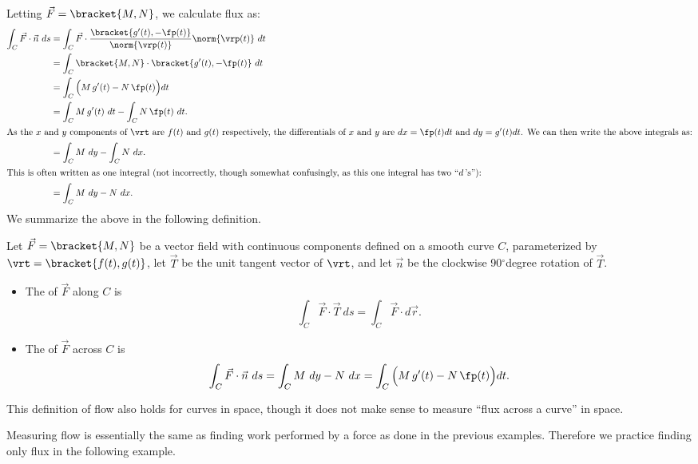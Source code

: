 Letting $\vec F =\bracket{M,N}$, we calculate flux as:
\begin{align*}
\int_C \vec F\cdot \vec n\ ds &= \int_C \vec F\cdot \frac{\bracket{g'(t),-\fp(t)}}{\norm{\vrp(t)}} \norm{\vrp(t)}\ dt \\
				&= \int_C\bracket{M,N}\cdot\bracket{g'(t),-\fp(t)}\ dt \\
				&= \int_C \Big(M\,g'(t) - N\,\fp(t)\Big)dt\\
				&= \int_C M\,g'(t)\ dt - \int_C N\,\fp(t)\ dt.\\
				\intertext{As the $x$ and $y$ components of $\vrt$ are $f(t)$ and $g(t)$ respectively, the differentials of $x$ and $y$ are $dx = \fp(t)dt$ and $dy=g'(t)dt$. We can then write the above integrals as:}
				&= \int_C M\ dy - \int_C N\ dx.\\
				\intertext{This is often written as one integral (not incorrectly, though somewhat confusingly, as this one integral has two ``$d$\,'s''):}
				&=\int_CM\ dy -N\ dx.
\end{align*}
We summarize the above in the following definition.

\begin{definition}\label{def:flowflux}
Let $\vec F=\bracket{M,N}$ be a vector field with continuous components defined on a smooth curve $C$, parameterized by $\vrt =\bracket{f(t),g(t)}$, let $\vec T$ be the unit tangent vector of $\vrt$, and let $\vec n$ be the clockwise 90$^\circ$degree rotation of $\vec T$.
\begin{itemize}
	\item The  of $\vec F$ along $C$ is
\[\int_C \vec F\cdot\vec T\ ds=\int_C \vec F\cdot d\vec r.\]
	\item The  of $\vec F$ across $C$ is
\[
\int_C \vec F\cdot \vec n\ ds =  \int_C M\ dy -N\ dx = \int_C\Big(M\,g'(t) - N\,\fp(t)\Big)dt.
\]
\end{itemize}
\end{definition}

This definition of flow also holds for curves in space, though it does not make sense to measure ``flux across a curve'' in space.

Measuring flow is essentially the same as finding work performed by a force as done in the previous examples. Therefore we practice finding only flux in the following example.

